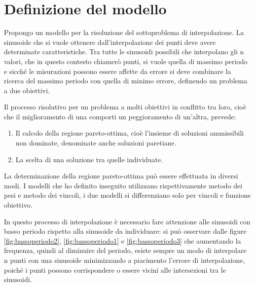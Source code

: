 \documentclass[a4paper,12pt]{report}
\begin{document}
\section{Definizione del modello}
Propongo un modello per la risoluzione del sottoproblema di interpolazione.
La sinusoide che si vuole ottenere dall'interpolazione dei punti deve avere determinate caratteristiche. Tra tutte le sinusoidi possibili che interpolano gli n valori, che in questo contesto chiamerò punti, si vuole quella di massimo periodo e sicché le misurazioni possono essere affette da errore si deve combinare la ricerca del massimo periodo con quella di minimo errore, definendo un problema a due obiettivi.

Il processo risolutivo per un problema a molti obiettivi in conflitto tra loro, cioè che il miglioramento di una comporti un peggioramento di un'altra, prevede:
\begin{enumerate}
  \item Il calcolo della regione pareto-ottima, cioè l'insieme di soluzioni ammissibili non dominate, denominate anche soluzioni paretiane.
  \item La scelta di una soluzione tra quelle individuate.
\end{enumerate}
La determinazione della regione pareto-ottima può essere effettuata in diversi modi. I modelli che ho definito inseguito utilizzano rispettivamente metodo dei pesi e metodo dei vincoli, i due modelli si differenziano solo per vincoli e funzione obiettivo.

In questo processo di interpolazione è necessario fare attenzione alle sinusoidi con basso periodo rispetto alla sinusoide da individuare: si può osservare dalle figure \ref{fig:bassoperiodo2}, \ref{fig:bassoperiodo1} e \ref{fig:bassoperiodo3} che aumentando la frequenza, quindi al diminuire del periodo, esiste sempre un modo di interpolare n punti con una sinusoide minimizzando a piacimento l'errore di interpolazione, poiché i punti possono corrispondere o essere vicini alle intersezioni tra le sinusoidi.
\end{document}

